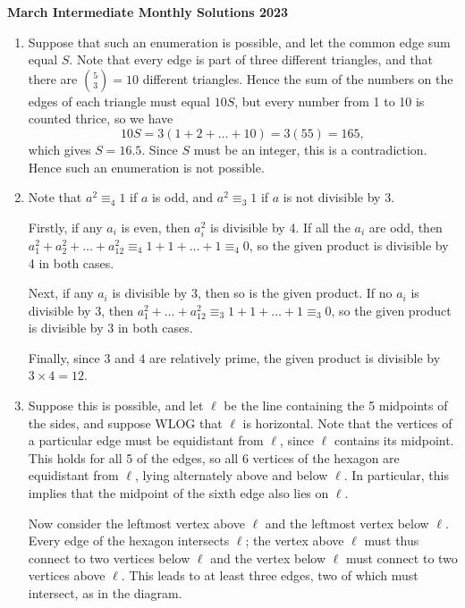 \documentclass{article}
\begin{document}
\thispagestyle{empty}

\begin{center}
  \textbf{\Large March Intermediate Monthly Solutions 2023}
  \\ \vspace{1em}
\end{center}

\bigskip

\begin{enumerate}
\item Suppose that such an enumeration is possible, and let the common edge sum equal $S$. Note that every edge is part of three different triangles, and that there are ${5 \choose 3} = 10$ different triangles. Hence the sum of the numbers on the edges of each triangle must equal $10S$, but every number from 1 to 10 is counted thrice, so we have 
$$10S = 3(1+2+\dots+10) = 3(55) = 165,$$
which gives $S = 16.5$. Since $S$ must be an integer, this is a contradiction. Hence such an enumeration is not possible. 

\item Note that $a^2 \equiv_4 1$ if $a$ is odd, and $a^2 \equiv_3 1$ if $a$ is not divisible by 3. 

Firstly, if any $a_i$ is even, then $a_i^2$ is divisible by 4. If all the $a_i$ are odd, then $a_1^2 + a_2^2 + \dots +a_{12}^2 \equiv_4 1 + 1 + \dots + 1 \equiv_4 0$, so the given product is divisible by 4 in both cases. 

Next, if any $a_i$ is divisible by 3, then so is the given product. If no $a_i$ is divisible by 3, then $a_1^2+\dots+a_{12}^2 \equiv_{3} 1+1+\dots+1 \equiv_3 0$, so the given product is divisible by 3 in both cases.

Finally, since $3$ and $4$ are relatively prime, the given product is divisible by $3\times 4 = 12$. 

\item Suppose this is possible, and let $\ell$ be the line containing the 5 midpoints of the sides, and suppose WLOG that $\ell$ is horizontal. Note that the vertices of a particular edge must be equidistant from $\ell$, since $\ell$ contains its midpoint. This holds for all 5 of the edges, so all 6 vertices of the hexagon are equidistant from $\ell$, lying alternately above and below $\ell$. In particular, this implies that the midpoint of the sixth edge also lies on $\ell$.

Now consider the leftmost vertex above $\ell$ and the leftmost vertex below $\ell$. Every edge of the hexagon intersects $\ell$; the vertex above $\ell$ must thus connect to two vertices below $\ell$ and the vertex below $\ell$ must connect to two vertices above $\ell$. This leads to at least three edges, two of which must intersect, as in the diagram. 


\end{enumerate}
\end{document}
